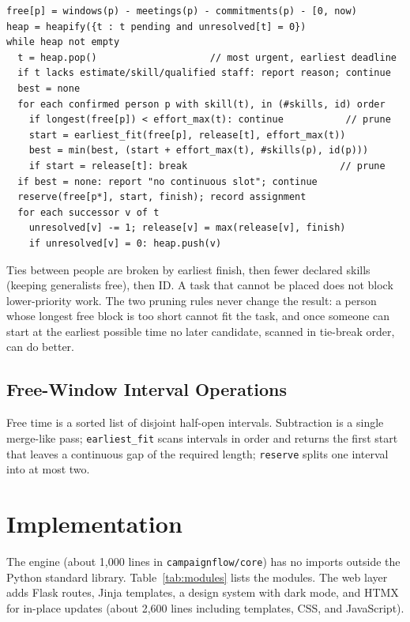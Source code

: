 \documentclass[sigconf,nonacm]{acmart}
\begin{document}
\begin{lstlisting}[style=pseudo]
free[p] = windows(p) - meetings(p) - commitments(p) - [0, now)
heap = heapify({t : t pending and unresolved[t] = 0})
while heap not empty
  t = heap.pop()                    // most urgent, earliest deadline
  if t lacks estimate/skill/qualified staff: report reason; continue
  best = none
  for each confirmed person p with skill(t), in (#skills, id) order
    if longest(free[p]) < effort_max(t): continue           // prune
    start = earliest_fit(free[p], release[t], effort_max(t))
    best = min(best, (start + effort_max(t), #skills(p), id(p)))
    if start = release[t]: break                           // prune
  if best = none: report "no continuous slot"; continue
  reserve(free[p*], start, finish); record assignment
  for each successor v of t
    unresolved[v] -= 1; release[v] = max(release[v], finish)
    if unresolved[v] = 0: heap.push(v)
\end{lstlisting}

Ties between people are broken by earliest finish, then fewer declared skills (keeping
generalists free), then ID. A task that cannot be placed does not block lower-priority work.
The two pruning rules never change the result: a person whose longest free block is too short
cannot fit the task, and once someone can start at the earliest possible time no later
candidate, scanned in tie-break order, can do better.

\subsection{Free-Window Interval Operations}
Free time is a sorted list of disjoint half-open intervals. Subtraction is a single merge-like
pass; \texttt{earliest\_fit} scans intervals in order and returns the first start that leaves
a continuous gap of the required length; \texttt{reserve} splits one interval into at most
two.

\section{Implementation}
The engine (about 1{,}000 lines in \texttt{campaignflow/core}) has no imports outside the Python
standard library. Table~\ref{tab:modules} lists the modules. The web layer adds Flask
routes, Jinja templates, a design system with dark mode, and HTMX for in-place updates
(about 2{,}600 lines including templates, CSS, and JavaScript).
\end{document}
